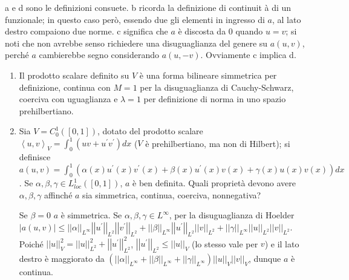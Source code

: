 \documentclass{article}
\begin{document}
a e d sono le definizioni consuete. b ricorda la definizione di continuit%
\`{a} di un funzionale; in questo caso per\`{o}, essendo due gli elementi in
ingresso di $a$, al lato destro compaiono due norme. c significa che $a$ 
\`{e} discosta da $0$ quando $u=v$; si noti che non avrebbe senso richiedere
una disuguaglianza del genere su $a\left( u,v\right) $, perch\'{e} $a$
cambierebbe segno considerando $a\left( u,-v\right) $. Ovviamente c implica
d.

\begin{enumerate}
\item Il prodotto scalare definito su $V$ \`{e} una forma bilineare
simmetrica per definizione, continua con $M=1$ per la disuguaglianza di
Cauchy-Schwarz, coerciva con uguaglianza e $\lambda =1$ per definizione di
norma in uno spazio prehilbertiano.

\item Sia $V=C_{0}^{1}\left( \left[ 0,1\right] \right) $, dotato del
prodotto scalare $\left\langle u,v\right\rangle _{V}=\int_{0}^{1}\left(
uv+u^{\prime }v^{\prime }\right) dx$ ($V$ \`{e} prehilbertiano, ma non di
Hilbert); si definisce $a\left( u,v\right) =\int_{0}^{1}\left( \alpha \left(
x\right) u^{\prime }\left( x\right) v^{\prime }\left( x\right) +\beta \left(
x\right) u^{\prime }\left( x\right) v\left( x\right) +\gamma \left( x\right)
u\left( x\right) v\left( x\right) \right) dx$. Se $\alpha ,\beta ,\gamma \in
L_{loc}^{1}\left( \left[ 0,1\right] \right) $, $a$ \`{e} ben definita. Quali
propriet\`{a} devono avere $\alpha ,\beta ,\gamma $ affinch\'{e} $a$ sia
simmetrica, continua, coerciva, nonnegativa?

Se $\beta =0$ $a$ \`{e} simmetrica. Se $\alpha ,\beta ,\gamma \in L^{\infty
} $, per la disuguaglianza di Hoelder $\left\vert a\left( u,v\right)
\right\vert \leq \left\vert \left\vert \alpha \right\vert \right\vert
_{L^{\infty }}\left\vert \left\vert u^{\prime }\right\vert \right\vert
_{L^{2}}\left\vert \left\vert v^{\prime }\right\vert \right\vert
_{L^{2}}+\left\vert \left\vert \beta \right\vert \right\vert _{L^{\infty
}}\left\vert \left\vert u^{\prime }\right\vert \right\vert
_{L^{2}}\left\vert \left\vert v\right\vert \right\vert _{L^{2}}+\left\vert
\left\vert \gamma \right\vert \right\vert _{L^{\infty }}\left\vert
\left\vert u\right\vert \right\vert _{L^{2}}\left\vert \left\vert
v\right\vert \right\vert _{L^{2}}$. Poich\'{e} $\left\vert \left\vert
u\right\vert \right\vert _{V}^{2}=\left\vert \left\vert u\right\vert
\right\vert _{L^{2}}^{2}+\left\vert \left\vert u^{\prime }\right\vert
\right\vert _{L^{2}}^{2}$, $\left\vert \left\vert u^{\prime }\right\vert
\right\vert _{L^{2}}\leq \left\vert \left\vert u\right\vert \right\vert _{V}$
(lo stesso vale per $v$) e il lato destro \`{e} maggiorato da $\left(
\left\vert \left\vert \alpha \right\vert \right\vert _{L^{\infty
}}+\left\vert \left\vert \beta \right\vert \right\vert _{L^{\infty
}}+\left\vert \left\vert \gamma \right\vert \right\vert _{L^{\infty
}}\right) \left\vert \left\vert u\right\vert \right\vert _{V}\left\vert
\left\vert v\right\vert \right\vert _{V}$, dunque $a$ \`{e} continua.


\end{enumerate}
\end{document}
